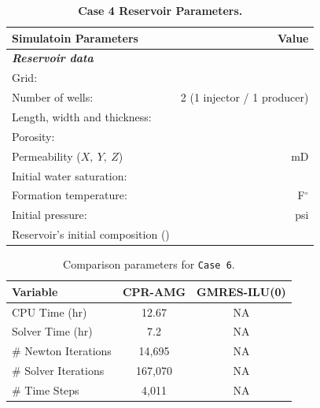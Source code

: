 \FloatBarrier
\begin{center}
\begin{table}[h!]
\begin{adjustbox}{width=0.5\textwidth}
    \begin{threeparttable}
    \caption{\textbf{Case 4 Reservoir Parameters\supercite{phdfernandes}.}}
    \label{case4}
        \begin{tabular}{l r }
            \toprule
            Simulatoin Parameters & Value\\
            \midrule
	\rowcolor{red!20}\textit{\textbf{Reservoir data}}      & \\
	Grid:      &            \\
	\rowcolor{blue!5}Number of wells:      &  2 (1 injector / 1 producer) \\
	Length, width and thickness:      & \\
	\rowcolor{blue!5}Porosity:       &           \\
	Permeability ($X, \ Y, \ Z$) &  mD\\
	\rowcolor{blue!5}Initial water saturation:    &  \\      
	Formation temperature:    &  F$^{\circ}$     \\
	\rowcolor{blue!5}Initial pressure:    &       psi\\
	Reservoir’s initial composition () & \\
        \bottomrule
        \end{tabular}
    \end{threeparttable}
\end{adjustbox}    
\end{table}
\end{center}
\FloatBarrier

\begin{table}[h!]
   \caption{Comparison parameters for \texttt{Case 6}.}
   \label{case6-tab}
   \small
   \centering
   \begin{tabular}{lcc}
   \toprule\toprule
   \textbf{Variable} & \textbf{CPR-AMG} & \textbf{GMRES-ILU(0)} \\
   \midrule
   CPU Time (hr) & 12.67 &  NA \\
   Solver Time (hr) & 7.2  & NA \\
   \# Newton Iterations & 14,695 & NA\\
   \# Solver Iterations & 167,070 & NA \\
   \# Time Steps & 4,011& NA \\
   \bottomrule
   \end{tabular}
\end{table}

